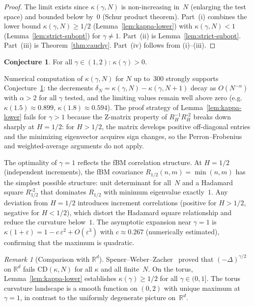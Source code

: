 \documentclass[11pt,a4paper]{article}
\theoremstyle{plain}
\theoremstyle{definition}
\newtheorem{conjecture}[theorem]{Conjecture}
\theoremstyle{remark}
\newtheorem{remark}[theorem]{Remark}
\newcommand{\R}{\mathbb{R}}
\begin{document}
\begin{proof}
The limit exists since $\kappa(\gamma,N)$ is non-increasing
in~$N$ (enlarging the test space) and bounded below by~$0$
(Schur product theorem). Part~(i) combines the lower bound
$\kappa(\gamma,N) \geq 1/2$
(Lemma~\ref{lem:kappa-lower}) with
$\kappa(\gamma,N) < 1$ (Lemma~\ref{lem:strict-subopt}) for
$\gamma \neq 1$. Part~(ii) is Lemma~\ref{lem:strict-subopt}.
Part~(iii) is Theorem~\ref{thm:cauchy}. Part~(iv)
follows from (i)--(iii).
\end{proof}

\begin{conjecture}\label{conj:kappa-positive}
For all $\gamma \in (1,2)$: $\kappa(\gamma) > 0$.
\end{conjecture}

Numerical computation of $\kappa(\gamma,N)$ for $N$ up to~$300$
strongly supports Conjecture~\ref{conj:kappa-positive}: the
decrements $\delta_N = \kappa(\gamma,N) - \kappa(\gamma,N{+}1)$
decay as $O(N^{-\alpha})$ with $\alpha > 2$ for all $\gamma$
tested, and the limiting values remain well above zero
(e.g.\ $\kappa(1.5) \approx 0.899$, $\kappa(1.8) \approx 0.594$).
The proof strategy of Lemma~\ref{lem:kappa-lower} fails for
$\gamma > 1$ because the Z-matrix property of
$R_H^{-1} R_H^{\circ 2}$ breaks down sharply at $H = 1/2$:
for $H > 1/2$, the matrix develops positive off-diagonal entries
and the minimizing eigenvector acquires sign changes, so the
Perron--Frobenius and weighted-average arguments do not apply.

The optimality of $\gamma = 1$ reflects the fBM correlation
structure.  At $H = 1/2$ (independent increments), the fBM
covariance $R_{1/2}(n,m) = \min(n,m)$ has the simplest possible
structure: unit determinant for all~$N$ and a Hadamard square
$R_{1/2}^{\circ 2}$ that dominates $R_{1/2}$ with minimum
eigenvalue exactly~$1$.
Any deviation from $H = 1/2$ introduces increment correlations
(positive for $H > 1/2$, negative for $H < 1/2$), which distort
the Hadamard square relationship and reduce the curvature
below~$1$.
The asymptotic expansion near $\gamma = 1$ is
$\kappa(1+\varepsilon) = 1 - c\,\varepsilon^2 + O(\varepsilon^3)$
with $c \approx 0.267$ (numerically estimated), confirming that
the maximum is quadratic.

\begin{remark}[Comparison with $\R^d$]\label{rem:Rd}
Spener--Weber--Zacher~\cite{SpenerWeberZacher2020} proved that
$(-\Delta)^{\gamma/2}$ on $\R^d$ fails $\mathrm{CD}(\kappa,N)$
for all $\kappa$ and all finite~$N$.
On the torus, Lemma~\ref{lem:kappa-lower} establishes
$\kappa(\gamma) \geq 1/2$ for all $\gamma \in (0,1]$.
The torus curvature landscape is a smooth function on $(0,2)$
with unique maximum at $\gamma = 1$, in contrast to the
uniformly degenerate picture on~$\R^d$.
\end{remark}
\end{document}
